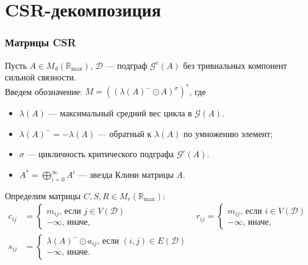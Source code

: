 \documentclass{beamer}
\begin{document}


\section{CSR-декомпозиция}
\begin{frame}
\frametitle{Матрицы CSR}
Пусть $A \in M_d(\mathbb{R}_{\max})$, $\mathcal{D}$ --- подграф $\mathcal{G}^c(A)$ без тривиальных компонент сильной связности. 
\\Введем обозначение: $M = ((\lambda(A)^-\odot A)^\sigma)^*$, где \\
\begin{itemize}
\item $\lambda(A)$ --- максимальный средний вес цикла в $\mathcal{G}(A)$.\\
\item $\lambda(A)^- = -\lambda(A)$ --- обратный к $\lambda(A)$ по умножению элемент;\\
\item $\sigma$ --- цикличность критического подграфа $\mathcal{G}^c(A)$.\\
\item $A^* = \bigoplus_{i = 0}^{\infty} A^i$ --- звезда Клини матрицы $A$.
\end{itemize}

Определим матрицы $C, S, R \in M_r(\mathbb{R}_{\max})$:
\begin{align*}
    c_{ij} &= \begin{cases}
        m_{ij}\text{, если } j \in V(\mathcal{D})\\
        -\infty \text{, иначе,}
    \end{cases}
    &
    r_{ij} = \begin{cases}
        m_{ij}\text{, если } i \in V(\mathcal{D})\\
        -\infty \text{, иначе,}
    \end{cases}
    \\
    s_{ij} &= \begin{cases}
        \lambda(A)^- \odot a_{ij}\text{, если } (i, j) \in E(\mathcal{D})\\
        -\infty \text{, иначе.}
    \end{cases}
\end{align*}
\end{frame}

\end{document}
